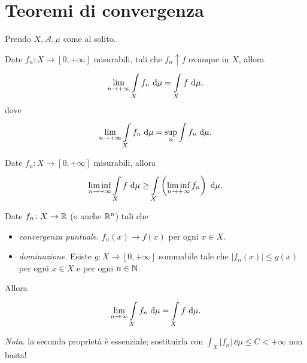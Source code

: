 \documentclass[a4paper, 11pt]{report}
\begin{document}
\section{Teoremi di convergenza}
Prendo $X, \mathcal{A}, \mu$ come al solito.
%
\begin{teorema}
Date $f_n \colon  X \to [0,+\infty]$ misurabili, tali che $f_n \uparrow f$ ovunque in $X$, allora
\[
	\lim_{n \to +\infty} \int\limits_{\mathclap{X}}^{} f_n \, \dd \mu = \int\limits_X f \, \dd \mu,
\] 
dove
\[
	\lim_{n \to +\infty} \int\limits_{\mathclap{X}}^{} f_n \, \dd \mu = \sup_n \int f_n \, \dd \mu.
\] 
\end{teorema}
%
\begin{teorema}
Date $f_n \colon X \to [0,+\infty]$ misurabili, allora
\[
	\liminf_{n \to +\infty} \int\limits_X f \, \dd \mu \geq \int\limits_{\mathclap{X}}^{} \left( \liminf_{n \to +\infty} f_n \right) \, \dd \mu.
\] 
\end{teorema}
%
\begin{teorema}
Date $f_n \colon  X \to \mathbb R$ (o anche $\mathbb R^n$) tali che
%
\begin{itemize}
	\item[] \textit{convergenza puntuale}. $f_n (x) \to f(x)$ per ogni $x \in X$.
	\item[] \textit{dominazione}. Esiste $g \colon X \to [0,+\infty]$ sommabile tale che $\left| f_n (x) \right| \leq g(x)$ per ogni $x \in X$ e per ogni $n \in \mathbb N$.
\end{itemize}
Allora
\[
	\lim_{n \to \infty} \int\limits_{\mathclap{X}}^{} f_n \, \dd \mu = \int\limits_X f \, \dd \mu. 
\] 
\end{teorema}
%
\textit{Nota.}
la seconda proprietà è essenziale; sostituirla con $\int_X \left| f_n \right| \, \dd \mu \leq C < + \infty$ non basta!
\end{document}
